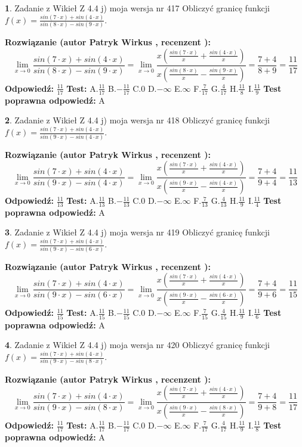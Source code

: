 \documentclass[12pt, a4paper]{article}
\theoremstyle{definition} %
\newtheorem{zad}{}
\newcommand{\zadStart}[1]{\begin{zad}#1\newline}
\newcommand{\zadStop}{\end{zad}}
\newcommand{\rozwStart}[2]{\noindent \textbf{Rozwiązanie (autor #1 , recenzent #2): }\newline}
\newcommand{\rozwStop}{\newline}
\newcommand{\odpStart}{\noindent \textbf{Odpowiedź:}\newline}
\newcommand{\odpStop}{\newline}
\newcommand{\testStart}{\noindent \textbf{Test:}\newline}
\newcommand{\testStop}{\newline}
\newcommand{\kluczStart}{\noindent \textbf{Test poprawna odpowiedź:}\newline}
\newcommand{\kluczStop}{\newline}
\begin{document}
\zadStart{Zadanie z Wikieł Z 4.4 j) moja wersja nr 417}
Obliczyć granicę funkcji $f(x)=\frac{sin(7\cdot x) +sin(4\cdot x)}{sin(8\cdot x) -sin(9\cdot x)}$.
\zadStop
\rozwStart{Patryk Wirkus}{}
$$\lim\limits_{x\to 0}\frac{sin(7\cdot x) +sin(4\cdot x)}{sin(8\cdot x) -sin(9\cdot x)}=\lim\limits_{x\to 0}\frac{x(\frac{sin(7\cdot x)}{x}+\frac{sin(4\cdot x)}{x})}{x(\frac{sin(8\cdot x)}{x}-\frac{sin(9\cdot x)}{x})}=\frac{7+4}{8+9} = \frac{11}{17}$$
\rozwStop
\odpStart
$\frac{11}{17}$
\odpStop
\testStart
A.$\frac{11}{17}$
B.$-\frac{11}{17}$
C.$0$
D.$-\infty$
E.$\infty$
F.$\frac{7}{17}$
G.$\frac{4}{17}$
H.$\frac{11}{8}$
I.$\frac{11}{9}$
\testStop
\kluczStart
A
\kluczStop



\zadStart{Zadanie z Wikieł Z 4.4 j) moja wersja nr 418}
Obliczyć granicę funkcji $f(x)=\frac{sin(7\cdot x) +sin(4\cdot x)}{sin(9\cdot x) -sin(4\cdot x)}$.
\zadStop
\rozwStart{Patryk Wirkus}{}
$$\lim\limits_{x\to 0}\frac{sin(7\cdot x) +sin(4\cdot x)}{sin(9\cdot x) -sin(4\cdot x)}=\lim\limits_{x\to 0}\frac{x(\frac{sin(7\cdot x)}{x}+\frac{sin(4\cdot x)}{x})}{x(\frac{sin(9\cdot x)}{x}-\frac{sin(4\cdot x)}{x})}=\frac{7+4}{9+4} = \frac{11}{13}$$
\rozwStop
\odpStart
$\frac{11}{13}$
\odpStop
\testStart
A.$\frac{11}{13}$
B.$-\frac{11}{13}$
C.$0$
D.$-\infty$
E.$\infty$
F.$\frac{7}{13}$
G.$\frac{4}{13}$
H.$\frac{11}{9}$
I.$\frac{11}{4}$
\testStop
\kluczStart
A
\kluczStop



\zadStart{Zadanie z Wikieł Z 4.4 j) moja wersja nr 419}
Obliczyć granicę funkcji $f(x)=\frac{sin(7\cdot x) +sin(4\cdot x)}{sin(9\cdot x) -sin(6\cdot x)}$.
\zadStop
\rozwStart{Patryk Wirkus}{}
$$\lim\limits_{x\to 0}\frac{sin(7\cdot x) +sin(4\cdot x)}{sin(9\cdot x) -sin(6\cdot x)}=\lim\limits_{x\to 0}\frac{x(\frac{sin(7\cdot x)}{x}+\frac{sin(4\cdot x)}{x})}{x(\frac{sin(9\cdot x)}{x}-\frac{sin(6\cdot x)}{x})}=\frac{7+4}{9+6} = \frac{11}{15}$$
\rozwStop
\odpStart
$\frac{11}{15}$
\odpStop
\testStart
A.$\frac{11}{15}$
B.$-\frac{11}{15}$
C.$0$
D.$-\infty$
E.$\infty$
F.$\frac{7}{15}$
G.$\frac{4}{15}$
H.$\frac{11}{9}$
I.$\frac{11}{6}$
\testStop
\kluczStart
A
\kluczStop



\zadStart{Zadanie z Wikieł Z 4.4 j) moja wersja nr 420}
Obliczyć granicę funkcji $f(x)=\frac{sin(7\cdot x) +sin(4\cdot x)}{sin(9\cdot x) -sin(8\cdot x)}$.
\zadStop
\rozwStart{Patryk Wirkus}{}
$$\lim\limits_{x\to 0}\frac{sin(7\cdot x) +sin(4\cdot x)}{sin(9\cdot x) -sin(8\cdot x)}=\lim\limits_{x\to 0}\frac{x(\frac{sin(7\cdot x)}{x}+\frac{sin(4\cdot x)}{x})}{x(\frac{sin(9\cdot x)}{x}-\frac{sin(8\cdot x)}{x})}=\frac{7+4}{9+8} = \frac{11}{17}$$
\rozwStop
\odpStart
$\frac{11}{17}$
\odpStop
\testStart
A.$\frac{11}{17}$
B.$-\frac{11}{17}$
C.$0$
D.$-\infty$
E.$\infty$
F.$\frac{7}{17}$
G.$\frac{4}{17}$
H.$\frac{11}{9}$
I.$\frac{11}{8}$
\testStop
\kluczStart
A
\kluczStop
\end{document}
